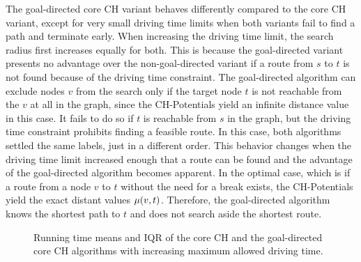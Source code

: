 The goal-directed core CH variant behaves differently compared to the core CH variant, except for very small driving time limits when both variants fail to find a path and terminate early. When increasing the driving time limit, the search radius first increases equally for both. This is because the goal-directed variant presents no advantage over the non-goal-directed variant if a route from $s$ to $t$ is not found because of the driving time constraint. The goal-directed algorithm can exclude nodes $v$ from the search only if the target node $t$ is not reachable from the $v$ at all in the graph, since the CH-Potentials yield an infinite distance value in this case. It fails to do so if $t$ is reachable from $s$ in the graph, but the driving time constraint prohibits finding a feasible route. In this case, both algorithms settled the same labels, just in a different order. This behavior changes when the driving time limit increased enough that a route can be found and the advantage of the goal-directed algorithm becomes apparent. In the optimal case, which is if a route from a node $v$ to $t$ without the need for a break exists, the CH-Potentials yield the exact distant values $\mu(v,t)$. Therefore, the goal-directed algorithm knows the shortest path to $t$ and does not search aside the shortest route.

\begin{figure}[hbtp]
	\centering
	\hfill
	\caption{Running time means and IQR of the core CH and the goal-directed core CH algorithms with increasing maximum allowed driving time.}
	\label{fig:eval_driving_time}
\end{figure}

